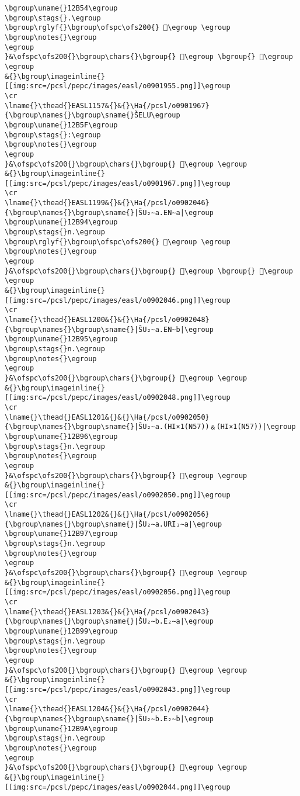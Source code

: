 \begin{verbatim}
\bgroup\uname{}12B54\egroup
\bgroup\stags{}.\egroup
\bgroup\rglyf{}\bgroup\ofspc\ofs200{} 𒭔\egroup \egroup
\bgroup\notes{}\egroup
\egroup
}&\ofspc\ofs200{}\bgroup\chars{}\bgroup{} 𒭔\egroup \bgroup{} 𒭕\egroup \egroup
&{}\bgroup\imageinline{}[[img:src=/pcsl/pepc/images/easl/o0901955.png]]\egroup
\cr
\lname{}\thead{}EASL1157&{}&{}\Ha{/pcsl/o0901967}{\bgroup\names{}\bgroup\sname{}ŠELU\egroup
\bgroup\uname{}12B5F\egroup
\bgroup\stags{}:\egroup
\bgroup\notes{}\egroup
\egroup
}&\ofspc\ofs200{}\bgroup\chars{}\bgroup{} 𒭟\egroup \egroup
&{}\bgroup\imageinline{}[[img:src=/pcsl/pepc/images/easl/o0901967.png]]\egroup
\cr
\lname{}\thead{}EASL1199&{}&{}\Ha{/pcsl/o0902046}{\bgroup\names{}\bgroup\sname{}|ŠU₂∼a.EN∼a|\egroup
\bgroup\uname{}12B94\egroup
\bgroup\stags{}n.\egroup
\bgroup\rglyf{}\bgroup\ofspc\ofs200{} 𒮔\egroup \egroup
\bgroup\notes{}\egroup
\egroup
}&\ofspc\ofs200{}\bgroup\chars{}\bgroup{} 𒮓\egroup \bgroup{} 𒮔\egroup \egroup
&{}\bgroup\imageinline{}[[img:src=/pcsl/pepc/images/easl/o0902046.png]]\egroup
\cr
\lname{}\thead{}EASL1200&{}&{}\Ha{/pcsl/o0902048}{\bgroup\names{}\bgroup\sname{}|ŠU₂∼a.EN∼b|\egroup
\bgroup\uname{}12B95\egroup
\bgroup\stags{}n.\egroup
\bgroup\notes{}\egroup
\egroup
}&\ofspc\ofs200{}\bgroup\chars{}\bgroup{} 𒮕\egroup \egroup
&{}\bgroup\imageinline{}[[img:src=/pcsl/pepc/images/easl/o0902048.png]]\egroup
\cr
\lname{}\thead{}EASL1201&{}&{}\Ha{/pcsl/o0902050}{\bgroup\names{}\bgroup\sname{}|ŠU₂∼a.(HI×1(N57))﹠(HI×1(N57))|\egroup
\bgroup\uname{}12B96\egroup
\bgroup\stags{}n.\egroup
\bgroup\notes{}\egroup
\egroup
}&\ofspc\ofs200{}\bgroup\chars{}\bgroup{} 𒮖\egroup \egroup
&{}\bgroup\imageinline{}[[img:src=/pcsl/pepc/images/easl/o0902050.png]]\egroup
\cr
\lname{}\thead{}EASL1202&{}&{}\Ha{/pcsl/o0902056}{\bgroup\names{}\bgroup\sname{}|ŠU₂∼a.URI₃∼a|\egroup
\bgroup\uname{}12B97\egroup
\bgroup\stags{}n.\egroup
\bgroup\notes{}\egroup
\egroup
}&\ofspc\ofs200{}\bgroup\chars{}\bgroup{} 𒮗\egroup \egroup
&{}\bgroup\imageinline{}[[img:src=/pcsl/pepc/images/easl/o0902056.png]]\egroup
\cr
\lname{}\thead{}EASL1203&{}&{}\Ha{/pcsl/o0902043}{\bgroup\names{}\bgroup\sname{}|ŠU₂∼b.E₂∼a|\egroup
\bgroup\uname{}12B99\egroup
\bgroup\stags{}n.\egroup
\bgroup\notes{}\egroup
\egroup
}&\ofspc\ofs200{}\bgroup\chars{}\bgroup{} 𒮙\egroup \egroup
&{}\bgroup\imageinline{}[[img:src=/pcsl/pepc/images/easl/o0902043.png]]\egroup
\cr
\lname{}\thead{}EASL1204&{}&{}\Ha{/pcsl/o0902044}{\bgroup\names{}\bgroup\sname{}|ŠU₂∼b.E₂∼b|\egroup
\bgroup\uname{}12B9A\egroup
\bgroup\stags{}n.\egroup
\bgroup\notes{}\egroup
\egroup
}&\ofspc\ofs200{}\bgroup\chars{}\bgroup{} 𒮚\egroup \egroup
&{}\bgroup\imageinline{}[[img:src=/pcsl/pepc/images/easl/o0902044.png]]\egroup

\end{verbatim}
